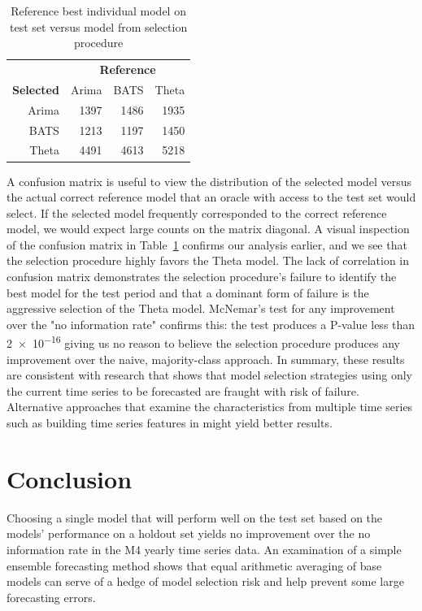 \documentclass[11pt,3p,review,authoryear]{elsarticle}
\begin{document}
\begin{table}[ht]
\centering
\begin{tabular}{rrrr}
  \hline
  & \multicolumn{3}{c}{\textbf{Reference}} \\
 \textbf{Selected} & Arima & BATS & Theta  \\
 \hline
 Arima & 1397 & 1486 & 1935 \\ 
   BATS & 1213 & 1197 & 1450 \\ 
  Theta & 4491 & 4613 & 5218 \\ 
   \hline
\end{tabular}
\caption{Reference best individual model on test set versus model from selection procedure}\label{tab:c}
\end{table}

A confusion matrix is useful to view the distribution of the selected model versus the actual correct reference model that an oracle with access to the test set would select. If the selected model frequently corresponded to the correct reference model, we would expect large counts on the matrix diagonal. A visual inspection of the confusion matrix in Table~\ref{tab:c} confirms our analysis earlier, and we see that the selection procedure highly favors the Theta model. The lack of correlation in confusion matrix demonstrates the selection procedure's failure to identify the best model for the test period and that a dominant form of failure is the aggressive selection of the Theta model. McNemar's test \citep{MCNEMAR} for any improvement over the "no information rate" confirms this: the test produces a P-value less than \num{2e-16} giving us no reason to believe the selection procedure produces any improvement over the naive, majority-class approach. In summary, these results are consistent with research that shows that model selection strategies using only the current time series to be forecasted are fraught with risk of failure. Alternative approaches that examine the characteristics from multiple time series such as building time series features in \cite{modelSelection} might yield better results.



\section{Conclusion}
Choosing a single model that will perform well on the test set based on the models' performance on a holdout set yields no improvement over the no information rate in the M4 yearly time series data. An examination of a simple ensemble forecasting method shows that equal arithmetic averaging of base models can serve of a hedge of model selection risk and help prevent some large forecasting errors.
\end{document}
